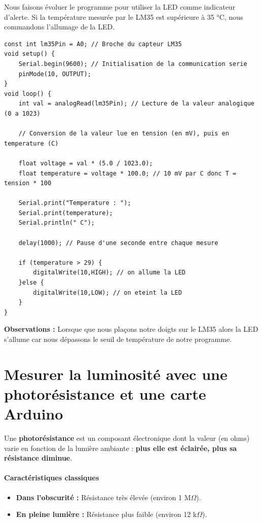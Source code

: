 Nous faisons évoluer le programme pour utiliser la LED comme indicateur d'alerte. Si la température mesurée par le LM35 est supérieure à 35 °C, nous commandons l'allumage de la LED.
\begin{lstlisting}				
const int lm35Pin = A0; // Broche du capteur LM35
void setup() {
	Serial.begin(9600); // Initialisation de la communication serie
	pinMode(10, OUTPUT);
}
void loop() {
	int val = analogRead(lm35Pin); // Lecture de la valeur analogique (0 a 1023)

	// Conversion de la valeur lue en tension (en mV), puis en temperature (C)
	
	float voltage = val * (5.0 / 1023.0);
	float temperature = voltage * 100.0; // 10 mV par C donc T = tension * 100
	
	Serial.print("Temperature : ");
	Serial.print(temperature);
	Serial.println(" C");
	
	delay(1000); // Pause d'une seconde entre chaque mesure
	
	if (temperature > 29) {
		digitalWrite(10,HIGH); // on allume la LED
	}else {
		digitalWrite(10,LOW); // on eteint la LED
	}
}
\end{lstlisting}
\textbf{Observations :} Lorsque que nous plaçons notre doigts sur le LM35 alors la LED s'allume car nous dépassons le seuil de température de notre programme.
\section{Mesurer la luminosité avec une photorésistance et une carte Arduino}
Une \textbf{photorésistance} est un composant électronique dont la valeur (en ohms) varie en fonction de la lumière ambiante : \textbf{plus elle est éclairée, plus sa résistance diminue}.

\paragraph{Caractéristiques classiques}
\begin{itemize}
	\item \textbf{Dans l'obscurité :} Résistance très élevée (environ 1 M$\Omega$).
	\item \textbf{En pleine lumière :} Résistance plus faible (environ 12 k$\Omega$).
\end{itemize}

